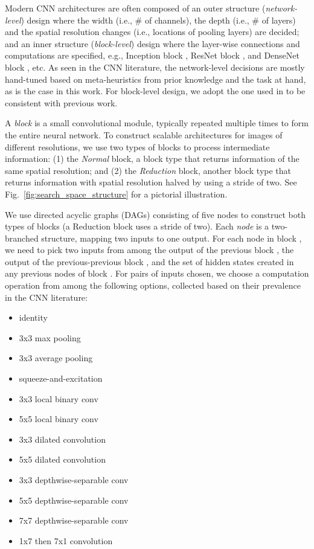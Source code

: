 \documentclass[journal]{IEEEtran}
\theoremstyle{definition}
\theoremstyle{remark}
\begin{document}
Modern CNN architectures are often composed of an outer structure (\emph{network-level}) design where the width (i.e., \# of channels), the depth (i.e., \# of layers) and the spatial resolution changes (i.e., locations of pooling layers) are decided; and an inner structure (\emph{block-level}) design where the layer-wise connections and computations are specified, e.g., Inception block \cite{googlenet}, ResNet block \cite{resnet}, and DenseNet block \cite{densenet}, etc. As seen in the CNN literature, the network-level decisions are mostly hand-tuned based on meta-heuristics from prior knowledge and the task at hand, as is the case in this work. For block-level design, we adopt the one used in \cite{nasnet2018,liu2018progressive,real2019regularized,liu2018darts} to be consistent with previous work.

A \emph{block} is a small convolutional module, typically repeated multiple times to form the entire neural network. To construct scalable architectures for images of different resolutions, we use two types of blocks to process intermediate information: (1) the \emph{Normal} block, a block type that returns information of the same spatial resolution; and (2) the \emph{Reduction} block,  another block type that returns information with spatial resolution halved by using a stride of two. See Fig.~\ref{fig:search_space_structure} for a pictorial illustration.

We use directed acyclic graphs (DAGs) consisting of five nodes to construct both types of blocks (a Reduction block uses a stride of two). Each \emph{node} is a two-branched structure, mapping two inputs to one output. For each node in block , we need to pick two inputs from among the output of the previous block , the output of the previous-previous block , and the set of hidden states created in any previous nodes of block . For pairs of inputs chosen, we choose a computation operation from among the following options, collected based on their prevalence in the CNN literature:
\vspace{-2mm}
\begin{multicols}{2}
\footnotesize{
\begin{itemize}
    \item identity
    \item 3x3 max pooling
    \item 3x3 average pooling
    \item squeeze-and-excitation \cite{hu2018squeeze}
    \item 3x3 local binary conv \cite{lbcnn}
    \item 5x5 local binary conv \cite{lbcnn}
    \item 3x3 dilated convolution
    \item 5x5 dilated convolution
    \item 3x3 depthwise-separable conv
    \item 5x5 depthwise-separable conv
    \item 7x7 depthwise-separable conv
    \item 1x7 then 7x1 convolution
\end{itemize}}
\end{multicols}
\vspace{-2mm}
\end{document}
